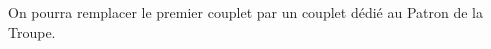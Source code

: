 \label{PriereDuSoirDeLaTroupe}


{\footnotesize On pourra remplacer le premier couplet par un couplet dédié au Patron de la Troupe.}


